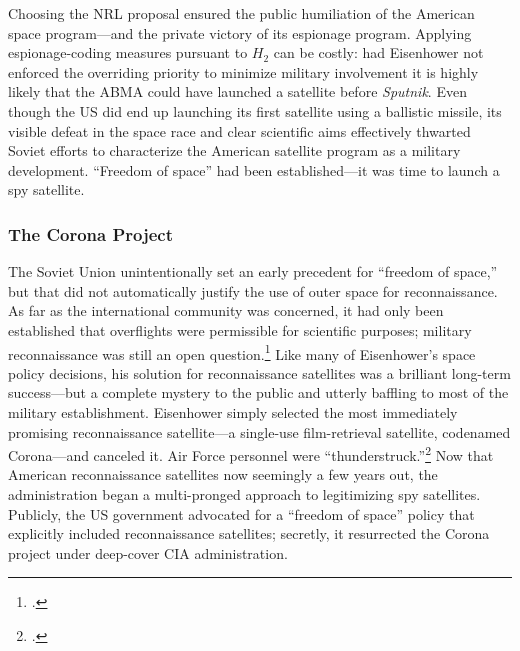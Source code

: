 \documentclass[12pt]{extarticle}
\begin{document}
Choosing the NRL proposal ensured the public humiliation of the American space program---and the private victory of its espionage program. Applying espionage-coding measures pursuant to $H_2$ can be costly: had Eisenhower not enforced the overriding priority to minimize military involvement it is highly likely that the ABMA could have launched a satellite before \emph{Sputnik}. Even though the US did end up launching its first satellite using a ballistic missile, its visible defeat in the space race and clear scientific aims effectively thwarted Soviet efforts to characterize the American satellite program as a military development. \enquote{Freedom of space} had been established---it was time to launch a spy satellite.

\subsubsection{The Corona Project}


The Soviet Union unintentionally set an early precedent for ``freedom of space,'' but that did not automatically justify the use of outer space for reconnaissance. As far as the international community was concerned, it had only been established that overflights were permissible for scientific purposes; military reconnaissance was still an open question.\footcite[47-48]{peebles_corona_1997} Like many of Eisenhower's space policy decisions, his solution for reconnaissance satellites was a brilliant long-term success---but a complete mystery to the public and utterly baffling to most of the military establishment. Eisenhower simply selected the most immediately promising reconnaissance satellite---a single-use film-retrieval satellite, codenamed Corona---and canceled it. Air Force personnel were ``thunderstruck.''\footcite[45]{peebles_corona_1997} Now that American reconnaissance satellites now seemingly a few years out, the administration began a multi-pronged approach to legitimizing spy satellites. Publicly, the US government advocated for a ``freedom of space'' policy that explicitly included reconnaissance satellites; secretly, it resurrected the Corona project under deep-cover CIA administration.
\end{document}
